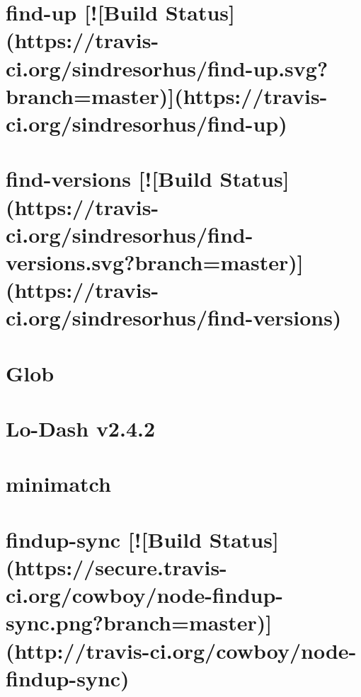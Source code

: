 \documentclass[twoside]{book}
\newcommand{\+}{\discretionary{\mbox{\scriptsize$\hookleftarrow$}}{}{}}
\begin{document}
\chapter{find-\/up \mbox{[}!\mbox{[}Build Status\mbox{]}(https\+://travis-\/ci.org/sindresorhus/find-\/up.svg?branch=master)\mbox{]}(https\+://travis-\/ci.org/sindresorhus/find-\/up)}
\label{md_app_web_node_modules_find-up_readme}

\chapter{find-\/versions \mbox{[}!\mbox{[}Build Status\mbox{]}(https\+://travis-\/ci.org/sindresorhus/find-\/versions.svg?branch=master)\mbox{]}(https\+://travis-\/ci.org/sindresorhus/find-\/versions)}
\label{md_app_web_node_modules_find-versions_readme}

\chapter{Glob}
\label{md_app_web_node_modules_findup-sync_node_modules_glob__r_e_a_d_m_e}

\chapter{Lo-\/\+Dash v2.4.2}
\label{md_app_web_node_modules_findup-sync_node_modules_lodash__r_e_a_d_m_e}

\chapter{minimatch}
\label{md_app_web_node_modules_findup-sync_node_modules_minimatch__r_e_a_d_m_e}

\chapter{findup-\/sync \mbox{[}!\mbox{[}Build Status\mbox{]}(https\+://secure.travis-\/ci.org/cowboy/node-\/findup-\/sync.png?branch=master)\mbox{]}(http\+://travis-\/ci.org/cowboy/node-\/findup-\/sync)}
\label{md_app_web_node_modules_findup-sync__r_e_a_d_m_e}

\end{document}
